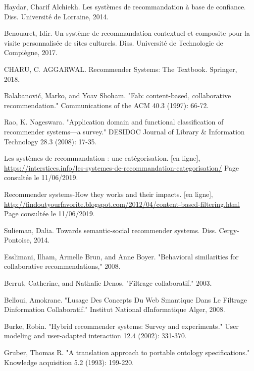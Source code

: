 \newpage
{} 

\begin{thebibliography}{100}
 Haydar, Charif Alchiekh. Les systèmes de recommandation à base de confiance. Diss. Université de Lorraine, 2014.


Benouaret, Idir. Un système de recommandation contextuel et composite pour la visite personnalisée de sites culturels. Diss. Université de Technologie de Compiègne, 2017.

 CHARU, C. AGGARWAL. Recommender Systems: The Textbook. Springer, 2018.

  Balabanović, Marko, and Yoav Shoham. "Fab: content-based, collaborative recommendation." Communications of the ACM 40.3 (1997): 66-72.

 Rao, K. Nageswara. "Application domain and functional classification of recommender systems—a survey." DESIDOC Journal of Library \& Information Technology 28.3 (2008): 17-35.

 Les systèmes de recommandation : une catégorisation. [en ligne], \url{https://interstices.info/les-systemes-de-recommandation-categorisation/} Page consultée le 11/06/2019.

 Recommender systems-How they works and their impacts. [en ligne], \url{http://findoutyourfavorite.blogspot.com/2012/04/content-based-filtering.html} Page consultée le 11/06/2019.


 Sulieman, Dalia. Towards semantic-social recommender systems. Diss. Cergy-Pontoise, 2014.

 Esslimani, Ilham, Armelle Brun, and Anne Boyer. "Behavioral similarities for collaborative recommendations," 2008.

 Berrut, Catherine, and Nathalie Denos. "Filtrage collaboratif." 2003.

 Belloui, Amokrane. "Lusage Des Concepts Du Web Smantique Dans Le Filtrage Dinformation Collaboratif." Institut National dInformatique Alger, 2008.

 Burke, Robin. "Hybrid recommender systems: Survey and experiments." User modeling and user-adapted interaction 12.4 (2002): 331-370.

 Gruber, Thomas R. "A translation approach to portable ontology specifications." Knowledge acquisition 5.2 (1993): 199-220.


\end{thebibliography}
